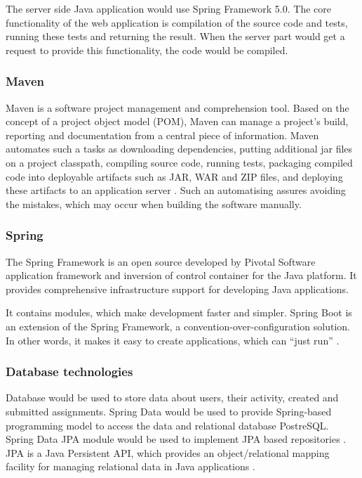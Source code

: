 The server side Java application would use Spring Framework 5.0. The core functionality of the web application is compilation of the source code and tests, running these tests and returning the result. When the server part would get a request to provide this functionality, the code would be compiled.

\subsubsection{Maven}

Maven is a software project management and comprehension tool. Based on the concept of a project object model (POM), Maven can manage a project's build, reporting and documentation from a central piece of information. Maven automates such a tasks as downloading dependencies, putting additional jar files on a project classpath, compiling source code, running tests, packaging compiled code into deployable artifacts such as JAR, WAR and ZIP files, and deploying these artifacts to an application server \cite{maven}. Such an automatising assures avoiding the mistakes, which may occur when building the software manually.

\subsubsection{Spring}

The Spring Framework is an open source developed by Pivotal Software application framework and inversion of control container for the Java platform. It provides comprehensive infrastructure support for developing Java applications. 

It contains modules, which make development faster and simpler. Spring Boot is an extension of the Spring Framework, a convention-over-configuration solution. In other words, it makes it easy to create applications, which can ``just run'' \cite{spring_boot}.

\subsubsection{Database technologies}

Database would be used to store data about users, their activity, created and submitted assignments. Spring Data would be used to provide Spring-based programming model to access the data and relational database PostreSQL. Spring Data JPA module would be used to implement JPA based repositories \cite{spring_data}. JPA is a Java Persistent API, which provides an object/relational mapping facility for managing relational data in Java applications \cite[Part VI, Persistence]{jpa}.

